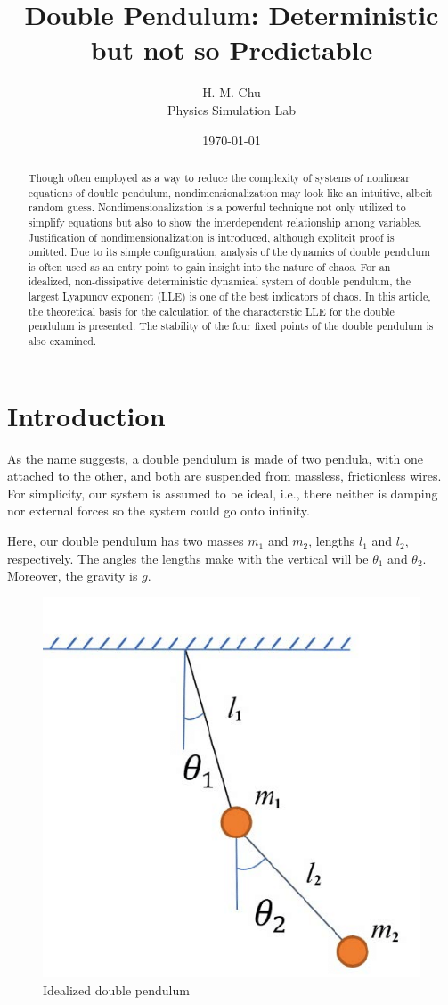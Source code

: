 \documentclass{article}
\title{Double Pendulum: Deterministic but not so Predictable}
\author{H. M. Chu  \\
	Physics Simulation Lab  \\
	}
\date{\today}
\begin{document}
\maketitle


\begin{abstract}
Though often employed as a way to reduce the complexity of systems of nonlinear equations of double pendulum, nondimensionalization may look like an intuitive, albeit random guess. Nondimensionalization is a powerful technique not only utilized to simplify equations but also to show the interdependent relationship among variables. Justification of nondimensionalization is introduced, although explitcit proof is omitted. Due to its simple configuration, analysis of the dynamics of double pendulum is often used as an entry point to gain insight into the nature of chaos. For an idealized, non-dissipative deterministic dynamical system of double pendulum, the largest Lyapunov exponent (LLE) is one of the best indicators of chaos. In this article, the theoretical basis for the calculation of the characterstic LLE for the double pendulum is presented. The stability of the four fixed points of the double pendulum is also examined. 

\end{abstract}

\section{Introduction}

As the name suggests, a double pendulum is made of two pendula, with one attached to the other, and both are suspended from massless, frictionless wires. For simplicity, our system is assumed to be ideal, i.e., there neither is damping nor external forces so the system could go onto infinity.

Here, our double pendulum has two masses $m_1$ and $m_2$, lengths $l_1$ and $l_2$, respectively. The angles the lengths make with the vertical will be $\theta_1$ and $\theta_2$. Moreover, the gravity is $g$. 


\begin{figure}[h]
\centering
\includegraphics[width=0.5\linewidth]{pend.png}
\caption{Idealized double pendulum}
\end{figure}
\end{document}

